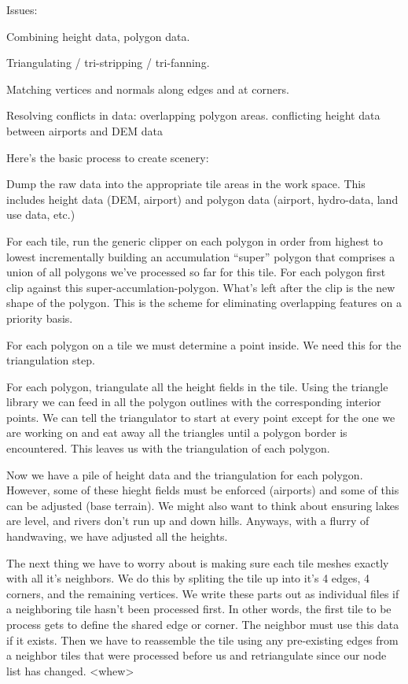 \documentclass[12pt]{article}
\begin{document}
Issues:

Combining height data, polygon data.

Triangulating / tri-stripping / tri-fanning.

Matching vertices and normals along edges and at corners.

Resolving conflicts in data:
  overlapping polygon areas.
  conflicting height data between airports and DEM data

Here's the basic process to create scenery:

Dump the raw data into the appropriate tile areas in the work space.
This includes height data (DEM, airport) and polygon data (airport,
hydro-data, land use data, etc.)

For each tile, run the generic clipper on each polygon in order from
highest to lowest incrementally building an accumulation ``super''
polygon that comprises a union of all polygons we've processed so far
for this tile.  For each polygon first clip against this
super-accumlation-polygon.  What's left after the clip is the new
shape of the polygon.  This is the scheme for eliminating overlapping
features on a priority basis.

For each polygon on a tile we must determine a point inside.  We need
this for the triangulation step.

For each polygon, triangulate all the height fields in the tile.
Using the triangle library we can feed in all the polygon outlines
with the corresponding interior points.  We can tell the triangulator
to start at every point except for the one we are working on and eat
away all the triangles until a polygon border is encountered.  This
leaves us with the triangulation of each polygon.

Now we have a pile of height data and the triangulation for each
polygon.  However, some of these hieght fields must be enforced
(airports) and some of this can be adjusted (base terrain).  We might
also want to think about ensuring lakes are level, and rivers don't
run up and down hills.  Anyways, with a flurry of handwaving, we have
adjusted all the heights.

The next thing we have to worry about is making sure each tile meshes
exactly with all it's neighbors.  We do this by spliting the tile up
into it's 4 edges, 4 corners, and the remaining vertices.  We write
these parts out as individual files if a neighboring tile hasn't been
processed first.  In other words, the first tile to be process gets to
define the shared edge or corner.  The neighbor must use this data if
it exists.  Then we have to reassemble the tile using any pre-existing
edges from a neighbor tiles that were processed before us and
retriangulate since our node list has changed. <whew>
\end{document}
